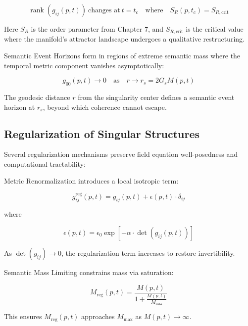 \begin{equation}
\operatorname{rank}(g_{ij}(p, t)) \ \text{changes at} \ t = t_c \quad \text{where} \quad S_R(p, t_c) = S_{R, \text{crit}}
\end{equation}

Here \(S_R\) is the order parameter from Chapter 7, and \(S_{R, \text{crit}}\) is the critical value where the manifold's attractor landscape undergoes a qualitative restructuring.

Semantic Event Horizons form in regions of extreme semantic mass where the temporal metric component vanishes asymptotically:

\begin{equation}
g_{00}(p, t) \to 0 \quad \text{as} \quad r \to r_s = 2G_s M(p, t)
\end{equation}

The geodesic distance \(r\) from the singularity center defines a semantic event horizon at \(r_s\), beyond which coherence cannot escape.

\subsection{Regularization of Singular Structures}

Several regularization mechanisms preserve field equation well-posedness and computational tractability:

Metric Renormalization introduces a local isotropic term:

\begin{equation}
g_{ij}^{\text{reg}}(p, t) = g_{ij}(p, t) + \epsilon(p, t) \cdot \delta_{ij}
\end{equation}

where

\begin{equation}
\epsilon(p, t) = \epsilon_0 \exp\left[-\alpha \cdot \det(g_{ij}(p, t))\right]
\end{equation}

As \(\det(g_{ij}) \to 0\), the regularization term increases to restore invertibility.

Semantic Mass Limiting constrains mass via saturation:

\begin{equation}
M_{\text{reg}}(p, t) = \frac{M(p, t)}{1 + \frac{M(p, t)}{M_{\text{max}}}}
\end{equation}

This ensures \(M_{\text{reg}}(p, t)\) approaches \(M_{\text{max}}\) as \(M(p, t) \to \infty\).


